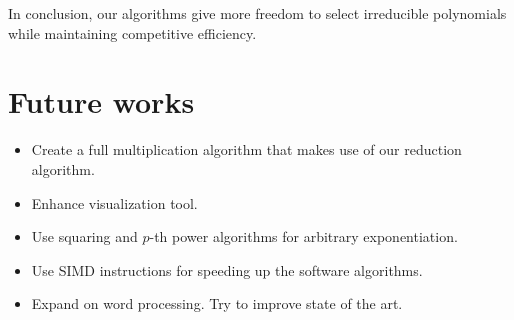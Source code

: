 In conclusion, our algorithms give more freedom to select irreducible polynomials while maintaining competitive efficiency.

\section{Future works}

\begin{itemize}
	\item Create a full multiplication algorithm that makes use of our reduction algorithm.
	\item Enhance visualization tool.
	\item Use squaring and $p$-th power algorithms for arbitrary exponentiation.
	\item Use SIMD instructions for speeding up the software algorithms.
	\item Expand on word processing. Try to improve state of the art.
\end{itemize}
